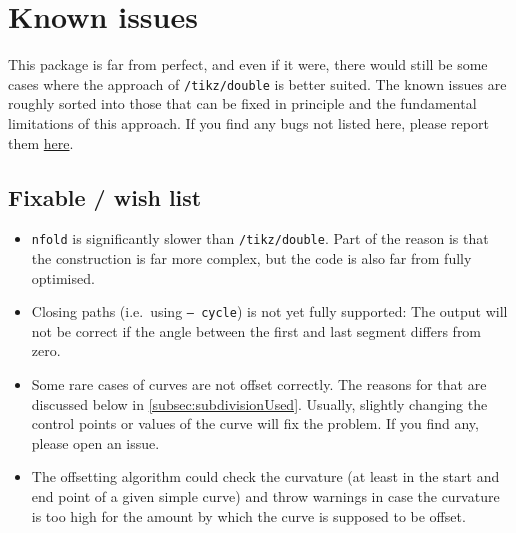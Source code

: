 \documentclass[12pt,a4paper]{article}
\theoremstyle{definition}
\newcommand{\tikzdouble}{\texttt{/tikz/double}}
\newcommand{\nfold}{\texttt{nfold}}
\begin{document}
\section{Known issues}

This package is far from perfect, and even if it were, there would still be some cases where the approach of \tikzdouble{} is better suited. The known issues are roughly sorted into those that can be fixed in principle and the fundamental limitations of this approach. If you find any bugs not listed here, please report them \href{https://github.com/jonschz/tikz-nfold/issues/}{here}.

\subsection{Fixable / wish list}
\begin{itemize}
  \item \nfold{} is significantly slower than \tikzdouble. Part of the reason is that the construction is far more complex, but the code is also far from fully optimised.
  \item Closing paths (i.e.\ using \texttt{-- cycle}) is not yet fully supported: The output will not be correct if the angle between the first and last segment differs from zero.
  \item Some rare cases of curves are not offset correctly. The reasons for that are discussed below in \cref{subsec:subdivisionUsed}. Usually, slightly changing the control points or values of the curve will fix the problem. If you find any, please open an issue.
  \item The offsetting algorithm could check the curvature (at least in the start and end point of a given simple curve) and throw warnings in case the curvature is too high for the amount by which the curve is supposed to be offset.
\end{itemize}
\end{document}
